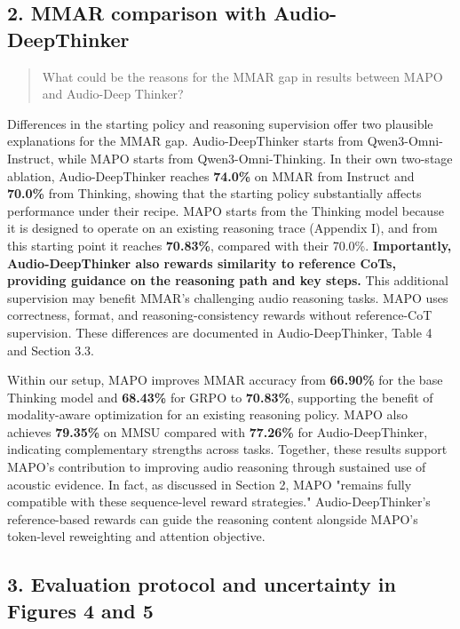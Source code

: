 \subsection*{2. MMAR comparison with Audio-DeepThinker}

\begin{quote}\small\color{ReviewQuote}
What could be the reasons for the MMAR gap in results between MAPO and Audio-Deep Thinker?

\end{quote}

Differences in the starting policy and reasoning supervision offer two plausible explanations for the MMAR gap. Audio-DeepThinker starts from Qwen3-Omni-Instruct, while MAPO starts from Qwen3-Omni-Thinking. In their own two-stage ablation, Audio-DeepThinker reaches \textbf{74.0\%} on MMAR from Instruct and \textbf{70.0\%} from Thinking, showing that the starting policy substantially affects performance under their recipe. MAPO starts from the Thinking model because it is designed to operate on an existing reasoning trace (Appendix I), and from this starting point it reaches \textbf{70.83\%}, compared with their 70.0\%. \textbf{Importantly, Audio-DeepThinker also rewards similarity to reference CoTs, providing guidance on the reasoning path and key steps.} This additional supervision may benefit MMAR's challenging audio reasoning tasks. MAPO uses correctness, format, and reasoning-consistency rewards without reference-CoT supervision. These differences are documented in Audio-DeepThinker, Table 4 and Section 3.3.

Within our setup, MAPO improves MMAR accuracy from \textbf{66.90\%} for the base Thinking model and \textbf{68.43\%} for GRPO to \textbf{70.83\%}, supporting the benefit of modality-aware optimization for an existing reasoning policy. MAPO also achieves \textbf{79.35\%} on MMSU compared with \textbf{77.26\%} for Audio-DeepThinker, indicating complementary strengths across tasks. Together, these results support MAPO's contribution to improving audio reasoning through sustained use of acoustic evidence. In fact, as discussed in Section 2, MAPO "remains fully compatible with these sequence-level reward strategies." Audio-DeepThinker's reference-based rewards can guide the reasoning content alongside MAPO's token-level reweighting and attention objective.

\subsection*{3. Evaluation protocol and uncertainty in Figures 4 and 5}

